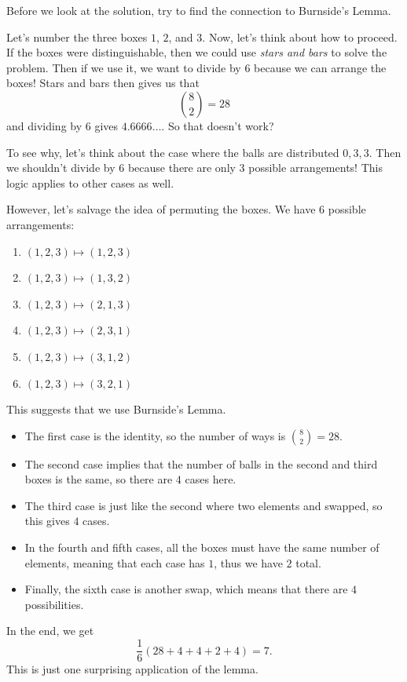 \documentclass[11pt]{scrartcl}
\begin{document}
Before we look at the solution, try to find the connection to Burnside's Lemma. 

Let's number the three boxes $1$, $2$, and $3$. Now, let's think about how to proceed. If the boxes were distinguishable, then we could use \textit{stars and bars} to solve the problem. Then if we use it, we want to divide by $6$ because we can arrange the boxes! Stars and bars then gives us that \[\binom{8}{2} = 28\] and dividing by $6$ gives $4.6666\dots$. So that doesn't work?

To see why, let's think about the case where the balls are distributed $0,3,3$. Then we shouldn't divide by $6$ because there are only $3$ possible arrangements! This logic applies to other cases as well.

However, let's salvage the idea of permuting the boxes. We have $6$ possible arrangements:
\begin{enumerate}
\item $(1,2,3) \mapsto (1,2,3)$
\item $(1,2,3) \mapsto (1,3,2)$
\item $(1,2,3) \mapsto (2,1,3)$
\item $(1,2,3) \mapsto (2,3,1)$
\item $(1,2,3) \mapsto (3,1,2)$
\item $(1,2,3) \mapsto (3,2,1)$
\end{enumerate}

This suggests that we use Burnside's Lemma.

\begin{itemize}
\item The first case is the identity, so the number of ways is $\binom{8}{2}=28$.
\item The second case implies that the number of balls in the second and third boxes is the same, so there are $4$ cases here.
\item The third case is just like the second where two elements and swapped, so this gives $4$ cases.
\item In the fourth and fifth cases, all the boxes must have the same number of elements, meaning that each case has $1$, thus we have $2$ total.
\item Finally, the sixth case is another swap, which means that there are $4$ possibilities.
\end{itemize}

In the end, we get \[\dfrac{1}{6}\left(28+4+4+2+4\right) = \boxed{7}.\] This is just one surprising application of the lemma.
\end{document}
